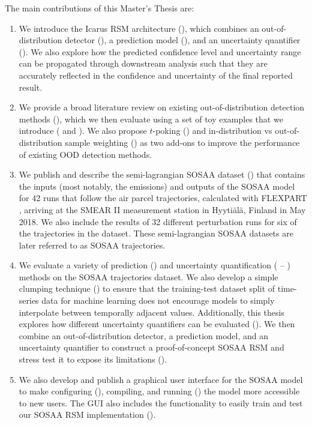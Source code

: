 \newpar The main contributions of this Master's Thesis are:
\begin{enumerate}
    \item We introduce the Icarus RSM architecture (), which combines an out-of-distribution detector (), a prediction model (), and an uncertainty quantifier (). We also explore how the predicted confidence level and uncertainty range can be propagated through downstream analysis such that they are accurately reflected in the confidence and uncertainty of the final reported result.
    \item We provide a broad literature review on existing out-of-distribution detection methods (), which we then evaluate using a set of toy examples that we introduce ( and ). We also propose $t$-poking () and in-distribution vs out-of-distribution sample weighting () as two add-ons to improve the performance of existing OOD detection methods.
    \item We publish and describe the semi-lagrangian SOSAA dataset () that contains the inputs (most notably, the emissions) and outputs of the SOSAA model for 42 runs that follow the air parcel trajectories, calculated with FLEXPART \cite{flexpart-10.4-2019}, arriving at the SMEAR II measurement station in Hyyti\"al\"a, Finland \cite{smear-station-2013} in May 2018. We also include the results of 32 different perturbation runs for six of the trajectories in the dataset. These semi-lagrangian SOSAA datasets are later referred to as SOSAA trajectories.
    \item We evaluate a variety of prediction () and uncertainty quantification ( -- ) methods on the SOSAA trajectories dataset. We also develop a simple clumping technique () to ensure that the training-test dataset split of time-series data for machine learning does not encourage models to simply interpolate between temporally adjacent values. Additionally, this thesis explores how different uncertainty quantifiers can be evaluated (). We then combine an out-of-distribution detector, a prediction model, and an uncertainty quantifier to construct a proof-of-concept SOSAA RSM and stress test it to expose its limitations ().
    \item We also develop and publish a graphical user interface for the SOSAA model to make configuring (), compiling, and running () the model more accessible to new users. The GUI also includes the functionality to easily train and test our SOSAA RSM implementation ().
\end{enumerate}
